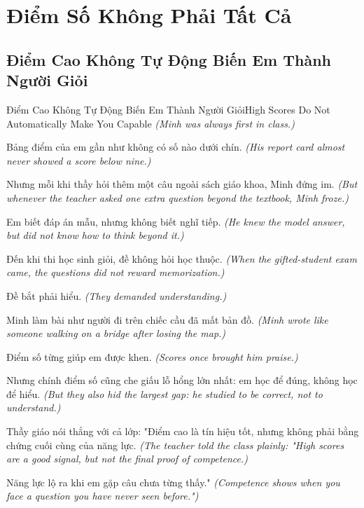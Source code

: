 \chapter{Điểm Số Không Phải Tất Cả}

\section{Điểm Cao Không Tự Động Biến Em Thành Người Giỏi}
\begin{truyen}{Điểm Cao Không Tự Động Biến Em Thành Người Giỏi}{High Scores Do Not Automatically Make You Capable}
\textit{(Minh was always first in class.)}

Bảng điểm của em gần như không có số nào dưới chín.
\textit{(His report card almost never showed a score below nine.)}

Nhưng mỗi khi thầy hỏi thêm một câu ngoài sách giáo khoa, Minh đứng im.
\textit{(But whenever the teacher asked one extra question beyond the textbook, Minh froze.)}

Em biết đáp án mẫu, nhưng không biết nghĩ tiếp.
\textit{(He knew the model answer, but did not know how to think beyond it.)}

Đến khi thi học sinh giỏi, đề không hỏi học thuộc.
\textit{(When the gifted-student exam came, the questions did not reward memorization.)}

Đề bắt phải hiểu.
\textit{(They demanded understanding.)}

Minh làm bài như người đi trên chiếc cầu đã mất bản đồ.
\textit{(Minh wrote like someone walking on a bridge after losing the map.)}

Điểm số từng giúp em được khen.
\textit{(Scores once brought him praise.)}

Nhưng chính điểm số cũng che giấu lỗ hổng lớn nhất: em học để đúng, không học để hiểu.
\textit{(But they also hid the largest gap: he studied to be correct, not to understand.)}

Thầy giáo nói thẳng với cả lớp: "Điểm cao là tín hiệu tốt, nhưng không phải bằng chứng cuối cùng của năng lực.
\textit{(The teacher told the class plainly: "High scores are a good signal, but not the final proof of competence.)}

Năng lực lộ ra khi em gặp câu chưa từng thấy."
\textit{(Competence shows when you face a question you have never seen before.")}

\end{truyen}

